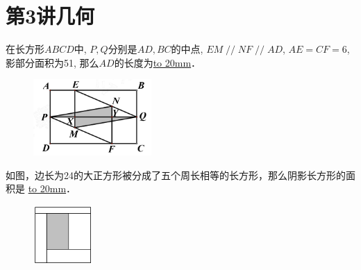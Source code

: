 \section{第3讲\quad 几何}

\item {
    在长方形$ABCD$中, $P,Q$分别是$AD,BC$的中点, $EM\mathop{//}NF\mathop{//}AD$, $AE=CF=6$,影部分面积为51, 那么$AD$的长度为\underline{\hbox to 20mm{}}．
    \begin{figure}[H] 
        \centering
        \includegraphics[width=0.4\textwidth]{./pics/Chapter_3/1.png}
    \end{figure}
    \vspace{1cm}
}

\item {
    如图，边长为24的大正方形被分成了五个周长相等的长方形，那么阴影长方形的面积是 \underline{\hbox to 20mm{}}．
    \begin{figure}[H] 
        \centering
        \includegraphics[width=0.2\textwidth]{./pics/Chapter_3/2.png}
    \end{figure}
    \vspace{1cm}
}

